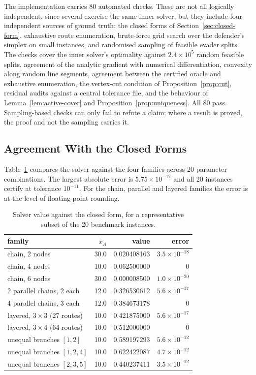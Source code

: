 \documentclass[10pt,a4paper,twoside]{article}
\theoremstyle{plain}
\theoremstyle{definition}
\newcommand{\XA}{\bar{x}_A}
\begin{document}
The implementation carries 80 automated checks. These are not all logically
independent, since several exercise the same inner solver, but they include
four independent sources of ground truth: the closed forms of
Section~\ref{sec:closed-form}, exhaustive route enumeration, brute-force grid
search over the defender's simplex on small instances, and randomised
sampling of feasible evader splits. The checks cover the inner solver's
optimality against $2.4\times10^5$ random feasible splits, agreement of the
analytic gradient with numerical differentiation, convexity along random line
segments, agreement between the certified oracle and exhaustive enumeration,
the vertex-cut condition of Proposition~\ref{prop:cut}, residual audits
against a central tolerance file, and the behaviour of
Lemma~\ref{lem:active-cover} and Proposition~\ref{prop:uniqueness}. All 80
pass. Sampling-based checks can only fail to refute a claim; where a result
is proved, the proof and not the sampling carries it.

\subsection{Agreement With the Closed Forms}
\label{sec:results-closed}

Table~\ref{tab:e1} compares the solver against the four families across 20
parameter combinations. The largest absolute error is
$5.75\times10^{-12}$ and all 20 instances certify at tolerance
$10^{-11}$. For the chain, parallel and layered families the error is at the
level of floating-point rounding.

\begin{table}[htbp]
\centering
\caption{Solver value against the closed form, for a representative subset of
the 20 benchmark instances.}
\label{tab:e1}
\small
\begin{tabular}{lrrr}
\toprule
family & $\XA$ & value & error \\
\midrule
chain, 2 nodes              & 30.0 & 0.020408163 & $3.5\times10^{-18}$\\
chain, 4 nodes              & 10.0 & 0.062500000 & $0$\\
chain, 6 nodes              & 30.0 & 0.000008500 & $1.0\times10^{-20}$\\
2 parallel chains, 2 each   & 12.0 & 0.326530612 & $5.6\times10^{-17}$\\
4 parallel chains, 3 each   & 12.0 & 0.384673178 & $0$\\
layered, $3\times3$ (27 routes) & 10.0 & 0.421875000 & $5.6\times10^{-17}$\\
layered, $3\times4$ (64 routes) & 10.0 & 0.512000000 & $0$\\
unequal branches $[1,2]$    & 10.0 & 0.589197293 & $5.6\times10^{-12}$\\
unequal branches $[1,2,4]$  & 10.0 & 0.622422087 & $4.7\times10^{-12}$\\
unequal branches $[2,3,5]$  & 10.0 & 0.440237411 & $3.5\times10^{-12}$\\
\bottomrule
\end{tabular}
\end{table}
\end{document}
